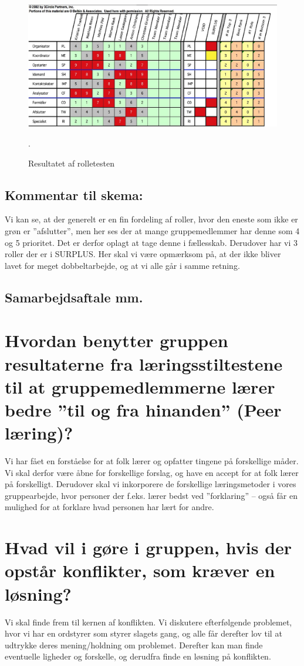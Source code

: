 \documentclass[oneside,a4paper,titlepage]{article}
\begin{document}
\begin{figure}[H]
   \centering
   \includegraphics[width=15cm]{./../graphics/rolletest}
   \caption{Resultatet af rolletesten}.
\end{figure}

\subsection*{Kommentar til skema:}
Vi kan se, at der generelt er en fin fordeling af roller, hvor den eneste som ikke er grøn er ”afslutter”, men her ses der at mange gruppemedlemmer har denne som 4 og 5 prioritet. Det er derfor oplagt at tage denne i fællesskab. Derudover har vi 3 roller der er i SURPLUS. Her skal vi være opmærksom på, at der ikke bliver lavet for meget dobbeltarbejde, og at vi alle går i samme retning.

\subsection{Samarbejdsaftale mm.}
\label{sec:samarbejdsaftale}

\section*{Hvordan benytter gruppen resultaterne fra læringsstiltestene til at gruppemedlemmerne lærer bedre ”til og fra hinanden” (Peer læring)?}
Vi har fået en forståelse for at folk lærer og opfatter tingene på forskellige måder. Vi skal derfor være åbne for forskellige forslag, og have en accept for at folk lærer på forskelligt. Derudover skal vi inkorporere de forskellige læringsmetoder i vores gruppearbejde, hvor personer der f.eks. lærer bedst ved ”forklaring” – også får en mulighed for at forklare hvad personen har lært for andre.
\section*{Hvad vil i gøre i gruppen, hvis der opstår konflikter, som kræver en løsning?}
Vi skal finde frem til kernen af konflikten. Vi diskutere efterfølgende problemet, hvor vi har en ordstyrer som styrer slagets gang, og alle får derefter lov til at udtrykke deres mening/holdning om problemet. Derefter kan man finde eventuelle ligheder og forskelle, og derudfra finde en løsning på konflikten.
\end{document}
